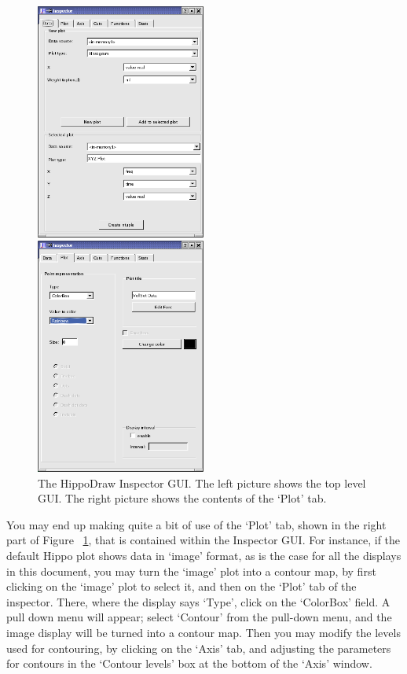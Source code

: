 \documentclass[10pt]{article}
\begin{document}
\begin{figure}
  \centering
  \begin{minipage}[c]{0.5\textwidth}
     \centering \includegraphics[width=2.2in]{Figures/inspector_top}
  \end{minipage}%
  \begin{minipage}[c]{0.5\textwidth}
     \centering \includegraphics[width=2.2in]{Figures/inspector_plot}
  \end{minipage}
  \caption {The HippoDraw Inspector GUI. The left picture shows the top
  level GUI. The right picture shows the contents of the `Plot' tab.}
  \label{fig:Inspector}
\end{figure}

You may end up making quite a bit of use of the `Plot' tab, shown
in the right part of Figure ~\ref{fig:Inspector}, that is contained within
the Inspector GUI. For instance, if the default Hippo plot shows data
in `image' format, as is the case for all the displays in this
document, you may turn the `image' plot into a contour map, by
first clicking on the `image' plot to select it, and then on the `Plot'
tab of the inspector. There, where the display says `Type', click on the 
`ColorBox' field. A pull down menu will appear; select `Contour' from
the pull-down menu, and the image display will be turned into a contour
map. Then you may modify the levels used for contouring, by clicking
on the `Axis' tab, and adjusting the parameters for contours in the
`Contour levels' box at the bottom of the `Axis' window.
\end{document}
